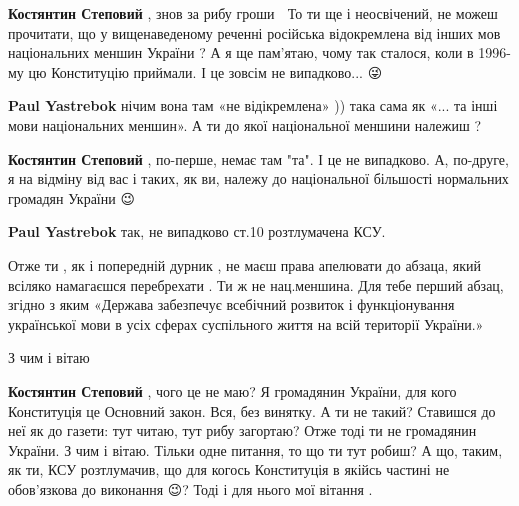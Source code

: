 \begin{itemize}
\begin{itemize}
\textbf{Костянтин Степовий} , знов за рибу гроши 🤣 То ти ще і неосвічений, не
можеш прочитати, що у вищенаведеному реченні російська відокремлена від інших
мов національних меншин України \Smiley[1.0][yellow]? А я ще пам’ятаю, чому так сталося, коли в
1996-му цю Конституцію приймали. І це зовсім не випадково... 😜

 
\textbf{Paul Yastrebok} нічим вона там «не відікремлена» )) така сама як «... та
інші мови національних меншин».  А ти до якої національної меншини належиш ?

 
\textbf{Костянтин Степовий} , по-перше, немає там "та". І це не випадково. А,
по-друге, я на відміну від вас і таких, як ви, належу до національної більшості
нормальних громадян України 😉

 
\textbf{Paul Yastrebok} так, не випадково ст.10 розтлумачена КСУ.

Отже ти , як і попередній дурник , не маєш права апелювати до абзаца, який
всіляко намагаєшся перебрехати . Ти ж не нац.меншина. Для тебе перший абзац,
згідно з яким «Держава забезпечує всебічний розвиток і функціонування
української мови в усіх сферах суспільного життя на всій території України.»

З чим і вітаю

 
\textbf{Костянтин Степовий} , чого це не маю? Я громадянин України, для кого
Конституція це Основний закон. Вся, без винятку. А ти не такий? Ставишся до неї
як до газети: тут читаю, тут рибу загортаю? Отже тоді ти не громадянин України.
З чим і вітаю. Тільки одне питання, то що ти тут робиш? А що, таким, як ти, КСУ
розтлумачив, що для когось Конституція в якійсь частині не обов’язкова до
виконання 😉? Тоді і для нього мої вітання \Laughey[1.0][white].


\end{itemize}
\end{itemize}
